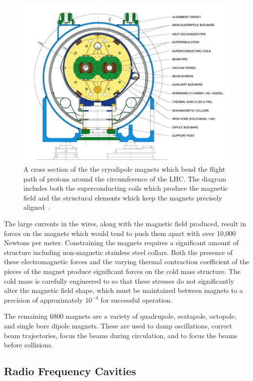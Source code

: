 \begin{figure}
\centering
\includegraphics[width=\fullfig]{figures/dipole_magnet.png}
\caption{A cross section of the the cryodipole magnets which bend the flight path of protons around the circumference of the \acs*{LHC}. The diagram includes both the superconducting coils which produce the magnetic field and the structural elements which keep the magnets precisely aligned~\cite{lhc_machine}.}
\label{fig:dipole_magnet}

\end{figure}

The large currents in the wires, along with the magnetic field produced, result in forces on the magnets which would tend to push them apart with over 10,000 Newtons per meter.
Constraining the magnets requires a significant amount of structure including non-magnetic stainless steel collars. 
Both the presence of these electromagnetic forces and the varying thermal contraction coefficient of the pieces of the magnet produce significant forces on the cold mass structure. 
The cold mass is carefully engineered to so that these stresses do not significantly alter the magnetic field shape, which must be maintained between magnets to a precision of approximately $10^{-4}$ for successful operation.

The remaining 6800 magnets are a variety of quadrupole, sextapole, octopole, and single bore dipole magnets.
These are used to damp oscillations, correct beam trajectories, focus the beams during circulation, and to focus the beams before collisions.

\subsection{Radio Frequency Cavities}
\label{sec:rfcavity}

